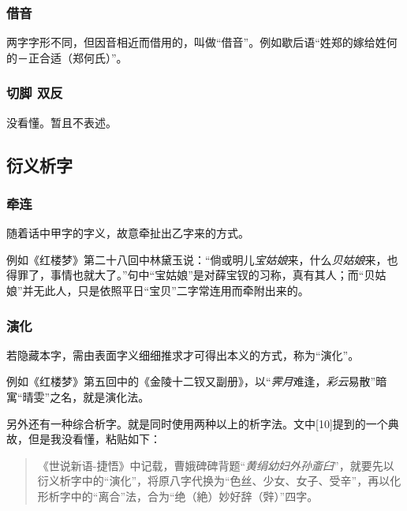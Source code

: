 \documentclass[]{article}
\begin{document}
\hypertarget{header-n539}{%
\subsubsection{借音}\label{header-n539}}

两字字形不同，但因音相近而借用的，叫做``借音''。例如歇后语``姓郑的嫁给姓何的－正合适（郑何氏）''。

\hypertarget{header-n533}{%
\subsubsection{切脚 双反}\label{header-n533}}

没看懂。暂且不表述。

\hypertarget{header-n450}{%
\subsection{衍义析字}\label{header-n450}}

\hypertarget{header-n551}{%
\subsubsection{牵连}\label{header-n551}}

随着话中甲字的字义，故意牵扯出乙字来的方式。

例如《红楼梦》第二十八回中林黛玉说：``倘或明儿\emph{宝姑娘}来，什么\emph{贝姑娘}来，也得罪了，事情也就大了。''句中``宝姑娘''是对薛宝钗的习称，真有其人；而``贝姑娘''并无此人，只是依照平日``宝贝''二字常连用而牵附出来的。

\hypertarget{header-n583}{%
\subsubsection{演化}\label{header-n583}}

若隐藏本字，需由表面字义细细推求才可得出本义的方式，称为``演化''。

例如《红楼梦》第五回中的《金陵十二钗又副册》，以``\emph{霁月}难逢，\emph{彩云}易散''暗寓``晴雯''之名，就是演化法。

另外还有一种综合析字。就是同时使用两种以上的析字法。文中{[}10{]}提到的一个典故，但是我没看懂，粘贴如下：

\begin{quote}
《世说新语-捷悟》中记载，曹娥碑碑背题``\emph{黄绢幼妇外孙齑臼}''，就要先以衍义析字中的``演化''，将原八字代换为``色丝、少女、女子、受辛''，再以化形析字中的``离合''法，合为``绝（絶）妙好辞（辤）''四字。
\end{quote}
\end{document}
